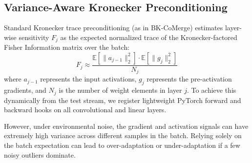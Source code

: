 \documentclass{article}
\theoremstyle{plain}
\theoremstyle{definition}
\theoremstyle{remark}
\begin{document}
\subsection{Variance-Aware Kronecker Preconditioning}
Standard Kronecker trace preconditioning (as in BK-CoMerge) estimates layer-wise sensitivity $F_j$ as the expected normalized trace of the Kronecker-factored Fisher Information matrix over the batch:
\begin{equation}
    F_j \approx \frac{\mathbb{E}[\|a_{j-1}\|_2^2] \cdot \mathbb{E}[\|g_j\|_2^2]}{N_j}
\end{equation}
where $a_{j-1}$ represents the input activations, $g_j$ represents the pre-activation gradients, and $N_j$ is the number of weight elements in layer $j$. To achieve this dynamically from the test stream, we register lightweight PyTorch forward and backward hooks on all convolutional and linear layers.

However, under environmental noise, the gradient and activation signals can have extremely high variance across different samples in the batch. Relying solely on the batch expectation can lead to over-adaptation or under-adaptation if a few noisy outliers dominate.
\end{document}
